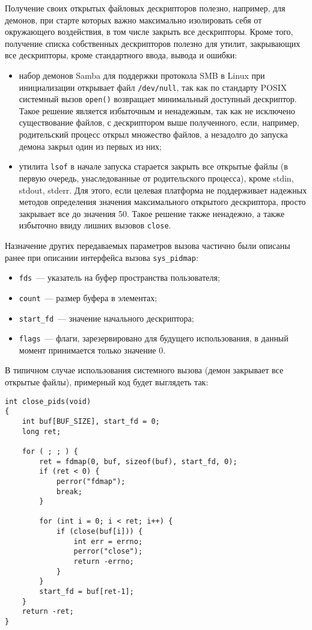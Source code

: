Получение своих открытых файловых дескрипторов полезно, например, для демонов,
при старте которых важно максимально изолировать себя от окружающего
воздействия, в том числе закрыть все дескрипторы. Кроме того, получение списка
собственных дескрипторов полезно для утилит, закрывающих все дескрипторы, кроме
стандартного ввода, вывода и ошибки:
\begin{itemize}
\item набор демонов Samba для поддержки протокола SMB в Linux при инициализации
  открывает файл \texttt{/dev/null}, так как по стандарту POSIX системный вызов
  \texttt{open()} возвращает минимальный доступный дескриптор. Такое решение
  является избыточным и ненадежным, так как не исключено существование файлов, с
  дескриптором выше полученного, если, например, родительский процесс открыл
  множество файлов, а незадолго до запуска демона закрыл один из первых из них;
\item утилита \texttt{lsof} в начале запуска старается закрыть все открытые
  файлы (в первую очередь, унаследованные от родительского процесса), кроме
  stdin, stdout, stderr. Для этого, если целевая платформа не поддерживает
  надежных методов определения значения максимального открытого дескриптора,
  просто закрывает все до значения 50. Такое решение также ненадежно, а также
  избыточно ввиду лишних вызовов \texttt{close}.
\end{itemize}

Назначение других передаваемых параметров вызова частично были описаны ранее при
описании интерфейса вызова \texttt{sys\_pidmap}:
\begin{itemize}
\item \texttt{fds}~--- указатель на буфер пространства пользователя;
\item \texttt{count}~--- размер буфера в элементах;
\item \texttt{start\_fd}~--- значение начального дескриптора;
\item \texttt{flags}~--- флаги, зарезервировано для будущего использования,
  в данный момент принимается только значение 0.
\end{itemize}

В типичном случае использования системного вызова (демон закрывает все открытые
файлы), примерный код будет выглядеть так:

\medskip
\begin{lstlisting}[style=cstyle]
int close_pids(void)
{
	int buf[BUF_SIZE], start_fd = 0;
	long ret;

	for ( ; ; ) {
		ret = fdmap(0, buf, sizeof(buf), start_fd, 0);
		if (ret < 0) {
			perror("fdmap");
			break;
		}

		for (int i = 0; i < ret; i++) {
			if (close(buf[i])) {
				int err = errno;
				perror("close");
				return -errno;
			}
		}
		start_fd = buf[ret-1];
	}
	return -ret;
}
\end{lstlisting}
\medskip

